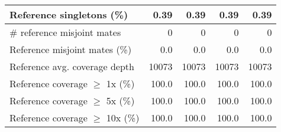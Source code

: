 \documentclass[12pt,a4paper]{article}
\begin{document}
\begin{table}[ht]
\begin{center}
\begin{tabular}{|l*{4}{|r}|}
Reference singletons (\%) & 0.39 & 0.39 & 0.39 & 0.39 \\ \hline
\# reference misjoint mates & 0 & 0 & 0 & 0 \\ \hline
Reference misjoint mates (\%) & 0.0 & 0.0 & 0.0 & 0.0 \\ \hline
Reference avg. coverage depth & 10073 & 10073 & 10073 & 10073 \\ \hline
Reference coverage $\geq$ 1x (\%) & 100.0 & 100.0 & 100.0 & 100.0 \\ \hline
Reference coverage $\geq$ 5x (\%) & 100.0 & 100.0 & 100.0 & 100.0 \\ \hline
Reference coverage $\geq$ 10x (\%) & 100.0 & 100.0 & 100.0 & 100.0 \\ \hline
\end{tabular}
\end{center}
\end{table}
\end{document}
